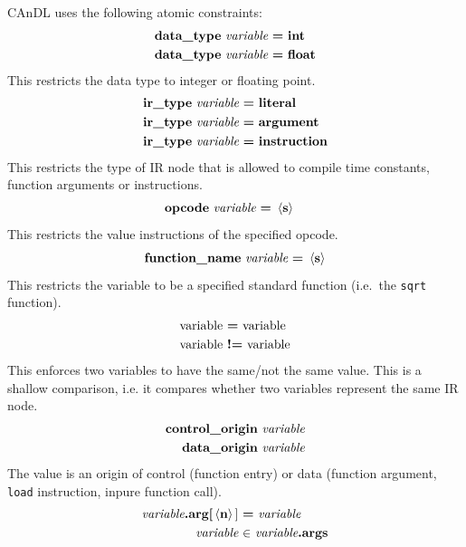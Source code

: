     CAnDL uses the following atomic constraints:
    \begin{align*}
        \text{\bf data\_type}\ \text{\it variable}\ &\text{\bf =}\ \text{\bf int}\\
        \text{\bf data\_type}\ \text{\it variable}\ &\text{\bf =}\ \text{\bf float}
    \end{align*}
    This restricts the data type to integer or floating point.
    \begin{align*}
        \text{\bf ir\_type}\ \text{\it variable}\ &\text{\bf =}\ \text{\bf literal}\\
        \text{\bf ir\_type}\ \text{\it variable}\ &\text{\bf =}\ \text{\bf argument}\\
        \text{\bf ir\_type}\ \text{\it variable}\ &\text{\bf =}\ \text{\bf instruction}
    \end{align*}
    This restricts the type of IR node that is allowed to compile time constants, function arguments or instructions.
    \begin{align*}
        \text{\bf opcode}\ \text{\it variable}\ &\text{\bf =}\ \left<\text{\bf s}\right>
    \end{align*}
    This restricts the value instructions of the specified opcode.
    \begin{align*}
        \text{\bf function\_name}\ \text{\it variable}\ \text{\bf =}\ \left<\text{\bf s}\right>
    \end{align*}
    This restricts the variable to be a specified standard function (i.e.\ the {\tt sqrt} function).
    \begin{align*}
        \text{variable}\ &\text{\bf =}\ \text{variable}\\
        \text{variable}\ &\text{\bf !=}\ \text{variable}
    \end{align*}
    This enforces two variables to have the same/not the same value.
    This is a shallow comparison, i.e. it compares whether two variables represent the same IR node. 
    \begin{align*}
        \text{\bf control\_origin}&\ \text{\it variable}\\
        \text{\bf data\_origin}&\ \text{\it variable}
    \end{align*}
    The value is an origin of control (function entry) or data (function argument, {\tt load} instruction, inpure function call).
    \begin{align*}
        \text{\it variable}\text{\bf.arg[}\left<\text{\bf n}\right>{\bf]}\ &\text{\bf =}\ \text{\it variable}\\
        \text{\it variable}\ &\text{\bf $\in$}\ \text{\it variable}\text{\bf .args}
    \end{align*}
